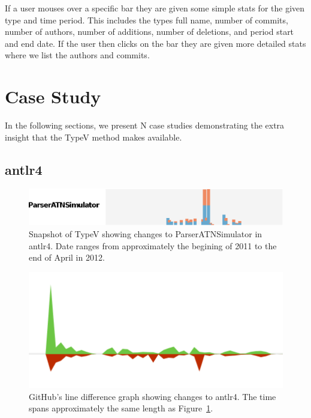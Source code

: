\documentclass[conference]{IEEEtran}
\begin{document}
If a user mouses over a specific bar they are given some simple stats for the given type and time period. This includes the types full name, number of commits, number of authors, number of additions, number of deletions, and period start and end date. If the user then clicks on the bar they are given more detailed stats where we list the authors and commits.

\section{Case Study}

In the following sections, we present {N} case studies demonstrating the extra insight that the TypeV method makes available. 

\subsection{antlr4}

\begin{figure}[!ht]
\centering
\includegraphics[width=\columnwidth]{ParserATNSimulator}
\caption{Snapshot of TypeV showing changes to ParserATNSimulator in antlr4. Date ranges from approximately the begining of 2011 to the end of April in 2012.}
\label{fig:parser1}

\end{figure}
\begin{figure}[!ht]
\centering
\includegraphics[width=\columnwidth]{Antlr4-GH-Lines-ParserATNSimulator}
\caption{GitHub's line difference graph showing changes to antlr4. The time spans approximately the same length as Figure~\ref{fig:parser1}.}
\label{fig:parser2}
\end{figure}
\end{document}
